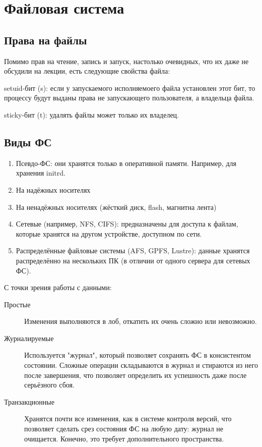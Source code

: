 \documentclass[main]{subfiles}
\begin{document}
\chapter{Файловая система}
\section{Права на файлы}
Помимо прав на чтение, запись и запуск, настолько очевидных, что их даже не
обсудили на лекции, есть следующие свойства файла:

setuid-бит (s): если у запускаемого исполняемоего файла установлен этот бит, то процессу
будут выданы права не запускающего пользователя, а владельца файла.

sticky-бит (t): удалять файлы может только их владелец.

\section{Виды ФС}
\begin{enumerate}
\item Псевдо-ФС: они хранятся только в оперативной памяти. Например, для хранения
initrd.
\item На надёжных носителях
\item На ненадёжных носителях (жёсткий диск, flash, магнитна лента)
\item Сетевые (например, NFS, CIFS): предназначены для доступа к файлам, которые
хранятся на другом устройстве, доступном по сети.
\item Распределённые файловые системы (AFS, GPFS, Lustre): данные хранятся
распределённо на нескольких ПК (в отличии от одного сервера для сетевых ФС).
\end{enumerate}

С точки зрения работы с данными:
\begin{description}
\item[Простые] Изменения выполняются в лоб, откатить их очень сложно или
невозможно.
\item[Журналируемые] Используется "журнал", который позволяет сохранять
ФС в консистентом состоянии. Сложные операции складываются в журнал и стираются
из него после завершения, что позволяет определить их успешность даже после
серьёзного сбоя.
\item[Транзакционные] Хранятся почти все изменения, как в системе контроля
версий, что позволяет сделать срез состояния ФС на любую дату: журнал не
очищается. Конечно, это требует дополнительного пространства.
\end{description}
\end{document}
